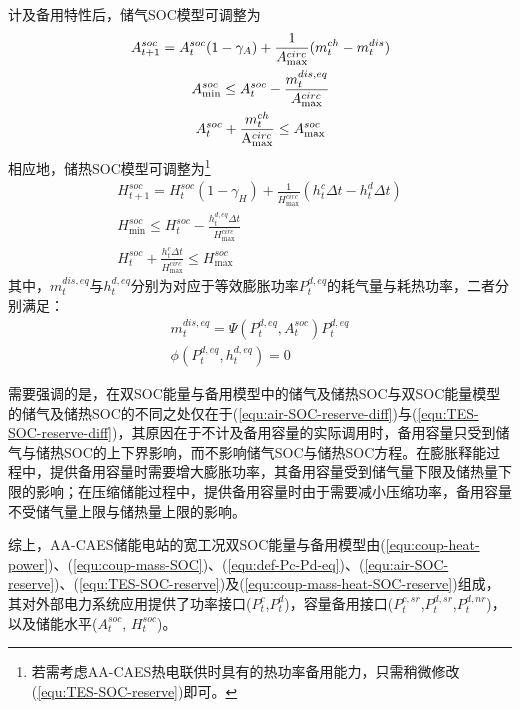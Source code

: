 计及备用特性后，储气SOC模型可调整为
\begin{subequations}
\label{equ:air-SOC-reserve}
\begin{gather}
A_{t + 1}^{soc} = A_t^{soc}(1-\gamma_A) + \frac{1}{{{A_{\max }^{circ}}}}({m_t^{ch} - m_t^{dis}})\\
A_{\min }^{soc} \le A_t^{soc} - \frac{{m_t^{dis,eq}}}{{{A_{\max}^{circ}}}}\label{equ:air-SOC-reserve-diff}\\
{{A}}_t^{soc} + \frac{{m_t^{ch}}}{{{{\rm{A}}_{\max}^{circ}}}} \le A_{\max }^{soc}
\end{gather}
\end{subequations}
相应地，储热SOC模型可调整为\footnote{若需考虑AA-CAES热电联供时具有的热功率备用能力，只需稍微修改(\ref{equ:TES-SOC-reserve})即可。}
\begin{subequations}
\label{equ:TES-SOC-reserve}
\begin{gather}
H_{t + 1}^{soc} = H_t^{soc}(1-\gamma_H) + \frac{1}{{{H_{\max}^{circ}}}}({h_t^c\Delta t - h_t^d\Delta t})\label{equ:TES-SOC-reserve-S1}\\
H_{\min }^{soc} \le H_t^{soc} - \frac{{h_t^{d,eq}\Delta t}}{{{H_{\max}^{circ}}}}\label{equ:TES-SOC-reserve-diff}\\
H_t^{soc} + \frac{{h_t^c\Delta t}}{{{H_{\max}^{circ}}}} \le H_{\max }^{soc}
\end{gather}
\end{subequations}
其中，$m_t^{dis,eq}$与$h_t^{d,eq}$分别为对应于等效膨胀功率$P_t^{d,eq}$的耗气量与耗热功率，二者分别满足：
\begin{subequations}
\label{equ:coup-mass-heat-SOC-reserve}
\begin{gather}
m_t^{dis,eq} = \Psi ({P_t^{d,eq},A_t^{soc}})P_t^{d,eq}\label{equ:coup-mass-SOC-reserve-S3}\\
\phi ({P_t^{d,eq},h_t^{d,eq}}) = 0\label{equ:coup-heat-power-reserve-S3}
\end{gather}
\end{subequations}

需要强调的是，在双SOC能量与备用模型中的储气及储热SOC与双SOC能量模型的储气及储热SOC的不同之处仅在于(\ref{equ:air-SOC-reserve-diff})与(\ref{equ:TES-SOC-reserve-diff})，其原因在于不计及备用容量的实际调用时，备用容量只受到储气与储热SOC的上下界影响，而不影响储气SOC与储热SOC方程。在膨胀释能过程中，提供备用容量时需要增大膨胀功率，其备用容量受到储气量下限及储热量下限的影响；在压缩储能过程中，提供备用容量时由于需要减小压缩功率，备用容量不受储气量上限与储热量上限的影响。

综上，AA-CAES储能电站的宽工况双SOC能量与备用模型由(\ref{equ:coup-heat-power})、(\ref{equ:coup-mass-SOC})、(\ref{equ:def-Pc-Pd-eq})、(\ref{equ:air-SOC-reserve})、(\ref{equ:TES-SOC-reserve})及(\ref{equ:coup-mass-heat-SOC-reserve})组成，其对外部电力系统应用提供了功率接口($P_t^c$,$P_t^d$)，容量备用接口($P_t^{c,sr}$,$P_t^{d,sr}$,$P_t^{d,nr}$)，以及储能水平($A_t^{soc}$, $H_t^{soc}$)。

